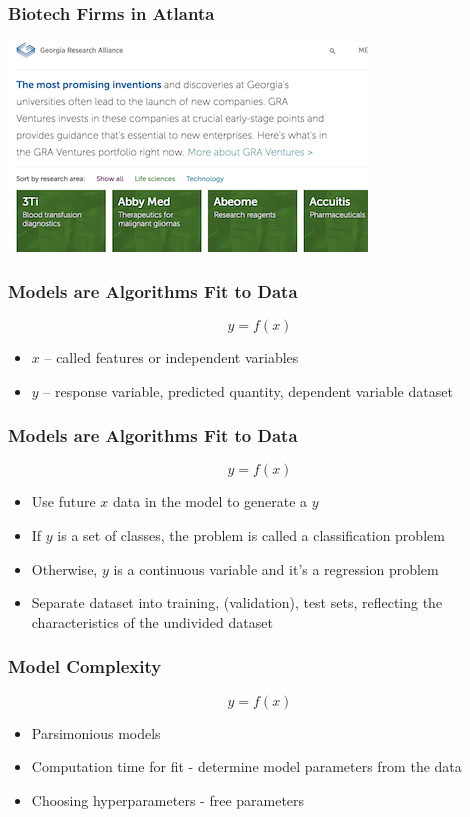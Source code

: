 \documentclass{beamer}
\begin{document}
\begin{frame}
\frametitle{Biotech Firms in Atlanta}

\includegraphics{gra}

\end{frame}


\begin{frame}
\frametitle{Models are Algorithms Fit to Data}
\begin{equation}
y = f(x)
\end{equation}
\begin{itemize}
\item $x$ -- called features or independent variables
\item $y$ -- response variable, predicted quantity, dependent variable
dataset
\end{itemize}
\end{frame}

\begin{frame}
\frametitle{Models are Algorithms Fit to Data}
\begin{equation}
y = f(x)
\end{equation}
\begin{itemize}
\item Use future $x$ data in the model to generate a $y$
\item If $y$ is a set of classes, the problem is called a classification problem
\item Otherwise, $y$ is a continuous variable and it's a regression problem
\item Separate dataset into training, (validation), test sets, reflecting the characteristics of the undivided dataset \end{itemize}
\end{frame}

\begin{frame}
\frametitle{Model Complexity}
\begin{equation}
y = f(x)
\end{equation}
\begin{itemize}
\item Parsimonious models
\item Computation time for fit - determine model parameters from the data
\item Choosing hyperparameters - free parameters 
\end{itemize}
\end{frame}
\end{document}
